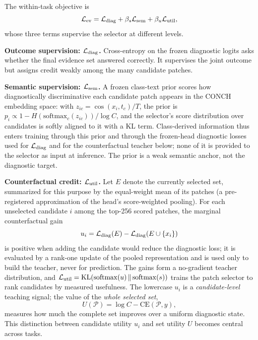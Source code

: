\documentclass{article}
\def\L{{\cal L}}
\newcommand{\Psel}{\mathcal{P}}
\begin{document}
The within-task objective is
\begin{equation}
\L_{\mathrm{ev}}
=
\L_{\mathrm{diag}}
+\beta_s\L_{\mathrm{sem}}
+\beta_u\L_{\mathrm{util}},
\end{equation}
whose three terms supervise the selector at different levels.

\textbf{Outcome supervision: $\L_{\mathrm{diag}}$.}
Cross-entropy on the frozen diagnostic logits asks whether the final evidence set answered correctly. It supervises the joint outcome but assigns credit weakly among the many candidate patches.

\textbf{Semantic supervision: $\L_{\mathrm{sem}}$.}
A frozen class-text prior scores how diagnostically discriminative each candidate patch appears in the CONCH embedding space: with $z_{ic}=\cos(x_i,t_c)/T$, the prior is $p_i\propto 1-H(\mathrm{softmax}_c(z_{ic}))/\log C$, and the selector's score distribution over candidates is softly aligned to it with a KL term. Class-derived information thus enters training through this prior and through the frozen-head diagnostic losses used for $\L_{\rm diag}$ and for the counterfactual teacher below; none of it is provided to the selector as input at inference. The prior is a weak semantic anchor, not the diagnostic target.

\textbf{Counterfactual credit: $\L_{\mathrm{util}}$.}
Let $E$ denote the currently selected set, summarized for this purpose by the equal-weight mean of its patches (a pre-registered approximation of the head's score-weighted pooling). For each unselected candidate $i$ among the top-256 scored patches, the marginal counterfactual gain
\begin{equation}
u_i
=
\L_{\mathrm{diag}}(E)
-
\L_{\mathrm{diag}}(E\cup\{x_i\})
\label{eq:ui}
\end{equation}
is positive when adding the candidate would reduce the diagnostic loss; it is evaluated by a rank-one update of the pooled representation and is used only to build the teacher, never for prediction. The gains form a no-gradient teacher distribution, and $\L_{\mathrm{util}}=\mathrm{KL}(\mathrm{softmax}(u)\,\Vert\,\mathrm{softmax}(s))$ trains the patch selector to rank candidates by measured usefulness. The lowercase $u_i$ is a \emph{candidate-level} teaching signal; the value of the \emph{whole selected set},
\begin{equation}
U(\Psel)
=
\log C-\mathrm{CE}(\Psel,y),
\label{eq:bigU}
\end{equation}
measures how much the complete set improves over a uniform diagnostic state. This distinction between candidate utility $u_i$ and set utility $U$ becomes central across tasks.
\end{document}
